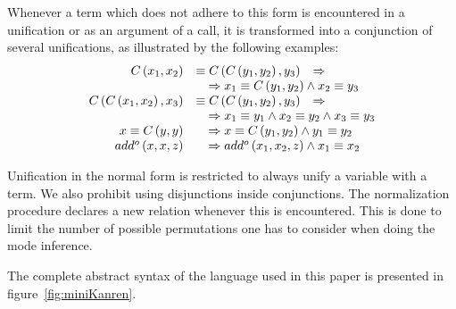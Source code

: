 Whenever a term which does not adhere to this form is encountered in a unification or as an argument of a call, it is transformed into a conjunction of several unifications, as illustrated by the following examples:
\[
    \begin{array}{rll}
        C\left( x_1, x_2 \right)                      & \equiv C\left( C\left( y_1, y_2 \right), y_3 \right)                                          & \Rightarrow \\
                                                      & \multicolumn{2}{l}{\quad\Rightarrow x_1 \equiv C\left( y_1, y_2 \right) \land x_2 \equiv y_3}               \\
        C\left( C\left( x_1, x_2 \right), x_3 \right) & \equiv C\left( C\left( y_1, y_2 \right), y_3 \right)                                          & \Rightarrow \\
                                                      & \multicolumn{2}{l}{\quad\Rightarrow x_1 \equiv y_1 \land x_2 \equiv y_2 \land x_3 \equiv y_3}               \\
        x \equiv C \left(y, y \right)                 & \multicolumn{2}{l}{\quad\Rightarrow x \equiv C \left(y_1, y_2\right) \land y_1 \equiv y_2}                  \\
        add^o\left( x, x, z \right)                   & \multicolumn{2}{l}{\quad\Rightarrow add^o\left( x_1, x_2, z \right) \land x_1 \equiv x_2}
    \end{array}
\]

Unification in the normal form is restricted to always unify a variable with a term.
We also prohibit using disjunctions inside conjunctions.
The normalization procedure declares a new relation whenever this is encountered.
This is done to limit the number of possible permutations one has to consider when doing the mode inference.

The complete abstract syntax of the \mk language used in this paper is presented in figure~\ref{fig:miniKanren}.